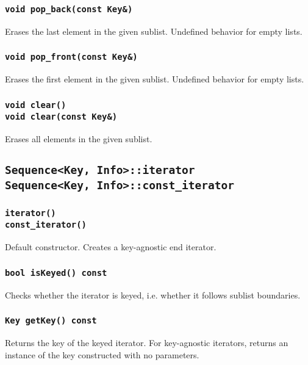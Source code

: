 ﻿\documentclass{article}
\begin{document}
\subsubsection{{\tt void pop\_back(const Key\&)}}

Erases the last element in the given sublist. Undefined behavior for empty
lists.

\subsubsection{{\tt void pop\_front(const Key\&)}}

Erases the first element in the given sublist. Undefined behavior for empty
lists.

\subsubsection{{\tt void clear()} \\
	{\tt void clear(const Key\&)}}

Erases all elements in the given sublist.

\subsection{{\tt Sequence<Key, Info>::iterator} \\
{\tt Sequence<Key, Info>::const\_iterator}}

\subsubsection{{\tt iterator()} \\
	{\tt const\_iterator()}}

Default constructor. Creates a key-agnostic end iterator.

\subsubsection{{\tt bool isKeyed() const}}

Checks whether the iterator is keyed, i.e. whether it follows sublist
boundaries.

\subsubsection{{\tt Key getKey() const}}

Returns the key of the keyed iterator. For key-agnostic iterators, returns an
instance of the key constructed with no parameters.
\end{document}
